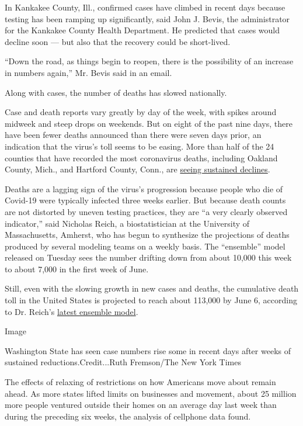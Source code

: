 In Kankakee County, Ill., confirmed cases have climbed in recent days
because testing has been ramping up significantly, said John J. Bevis,
the administrator for the Kankakee County Health Department. He
predicted that cases would decline soon --- but also that the recovery
could be short-lived.

``Down the road, as things begin to reopen, there is the possibility of
an increase in numbers again,'' Mr. Bevis said in an email.

Along with cases, the number of deaths has slowed nationally.

Case and death reports vary greatly by day of the week, with spikes
around midweek and steep drops on weekends. But on eight of the past
nine days, there have been fewer deaths announced than there were seven
days prior, an indication that the virus's toll seems to be easing. More
than half of the 24 counties that have recorded the most coronavirus
deaths, including Oakland County, Mich., and Hartford County, Conn., are
\href{https://twitter.com/familyunequal/status/1261426618544742400?s=21}{seeing
sustained declines}.

Deaths are a lagging sign of the virus's progression because people who
die of Covid-19 were typically infected three weeks earlier. But because
death counts are not distorted by uneven testing practices, they are ``a
very clearly observed indicator,'' said Nicholas Reich, a
biostatistician at the University of Massachusetts, Amherst, who has
begun to synthesize the projections of deaths produced by several
modeling teams on a weekly basis. The ``ensemble'' model released on
Tuesday sees the number drifting down from about 10,000 this week to
about 7,000 in the first week of June.

Still, even with the slowing growth in new cases and deaths, the
cumulative death toll in the United States is projected to reach about
113,000 by June 6, according to Dr. Reich's
\href{https://twitter.com/reichlab/status/1260279329025556480}{latest
ensemble model}.

Image

Washington State has seen case numbers rise some in recent days after
weeks of sustained reductions.Credit...Ruth Fremson/The New York Times

The effects of relaxing of restrictions on how Americans move about
remain ahead. As more states lifted limits on businesses and movement,
about 25 million more people ventured outside their homes on an average
day last week than during the preceding six weeks, the analysis of
cellphone data found.

